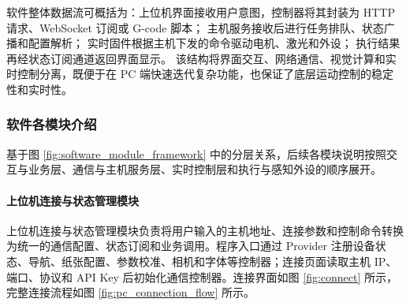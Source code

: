 ﻿\documentclass[UTF8,zihao=-4,fontset=windows]{ctexart}
\begin{document}
软件整体数据流可概括为：上位机界面接收用户意图，控制器将其封装为 HTTP 请求、WebSocket 订阅或 G-code 脚本；
主机服务接收后进行任务排队、状态广播和配置解析；
实时固件根据主机下发的命令驱动电机、激光和外设；
执行结果再经状态订阅通道返回界面显示。
该结构将界面交互、网络通信、视觉计算和实时控制分离，既便于在 PC 端快速迭代复杂功能，也保证了底层运动控制的稳定性和实时性。

\subsubsection{软件各模块介绍}
基于图 \ref{fig:software_module_framework} 中的分层关系，后续各模块说明按照交互与业务层、通信与主机服务层、实时控制层和执行与感知外设的顺序展开。
\paragraph{上位机连接与状态管理模块}
上位机连接与状态管理模块负责将用户输入的主机地址、连接参数和控制命令转换为统一的通信配置、状态订阅和业务调用。程序入口通过 Provider 注册设备状态、导航、纸张配置、参数校准、相机和字体等控制器；连接页面读取主机 IP、端口、协议和 API Key 后初始化通信控制器。连接界面如图 \ref{fig:connect} 所示，完整连接流程如图 \ref{fig:pc_connection_flow} 所示。
\end{document}
